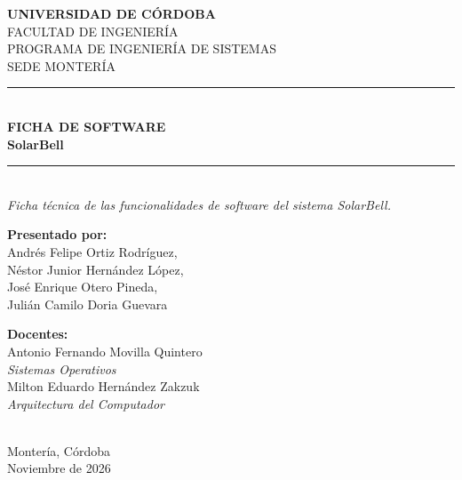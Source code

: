 \documentclass[12pt,letterpaper]{article}
\begin{document}
\begin{titlepage}
\centering
\vspace*{1cm}
{\Large \textbf{UNIVERSIDAD DE CÓRDOBA}}\\[0.3cm]
{\large FACULTAD DE INGENIERÍA}\\[0.2cm]
{\large PROGRAMA DE INGENIERÍA DE SISTEMAS}\\[0.2cm]
{\large SEDE MONTERÍA}\\[1.7cm]
\rule{\textwidth}{0.5pt}\\[0.3cm]
{\Huge \textbf{FICHA DE SOFTWARE}}\\[0.4cm]
{\LARGE \textbf{SolarBell}}\\[0.3cm]
\rule{\textwidth}{0.5pt}\\[0.5cm]
{\large \textit{Ficha técnica de las funcionalidades de software del sistema SolarBell.}}\\[2.5cm]
\begin{minipage}[t]{0.42\textwidth}
\begin{flushleft}
\textbf{Presentado por:}\\[0.2cm]
Andrés Felipe Ortiz Rodríguez,\\
Néstor Junior Hernández López,\\
José Enrique Otero Pineda,\\
Julián Camilo Doria Guevara
\end{flushleft}
\end{minipage}\hfill
\begin{minipage}[t]{0.52\textwidth}
\begin{flushright}
\textbf{Docentes:}\\[0.2cm]
Antonio Fernando Movilla Quintero\\
\textit{Sistemas Operativos}\\[0.3cm]
Milton Eduardo Hernández Zakzuk\\
\textit{Arquitectura del Computador}
\end{flushright}
\end{minipage}\\[2.5cm]
\vfill
Montería, Córdoba\\
Noviembre de 2026
\end{titlepage}
\newpage
{}\\[0.25cm]
\end{document}
